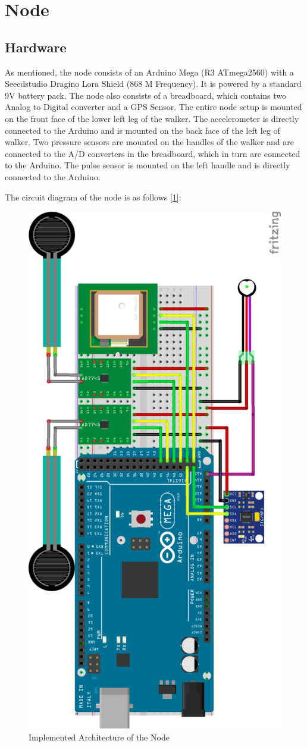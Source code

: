 \section{Node} 
	\subsection*{Hardware}
		As mentioned, the node consists of an Arduino Mega (R3 ATmega2560) with a Seeedstudio Dragino Lora Shield (868 M Frequency). It is powered by a standard 9V battery pack. The node also consists of a breadboard, which contains two Analog to Digital converter and a GPS Sensor. The entire node setup is mounted on the front face of the lower left leg of the walker. The accelerometer is directly connected to the Arduino and is mounted on the back face of the left leg of walker. Two pressure sensors are mounted on the handles of the walker and are connected to the A/D converters in the breadboard, which in turn are connected to the Arduino. The pulse sensor is mounted on the left handle and is directly connected to the Arduino.

		The circuit diagram of the node is as follows [\ref{fig:architecture_node}]:

		\begin{figure}[h!]
			\centering
			\includegraphics[width=0.7\linewidth]{gfx/node_diagram}
			\caption{Implemented Architecture of the Node}
			\label{fig:architecture_node}
		\end{figure}
		
